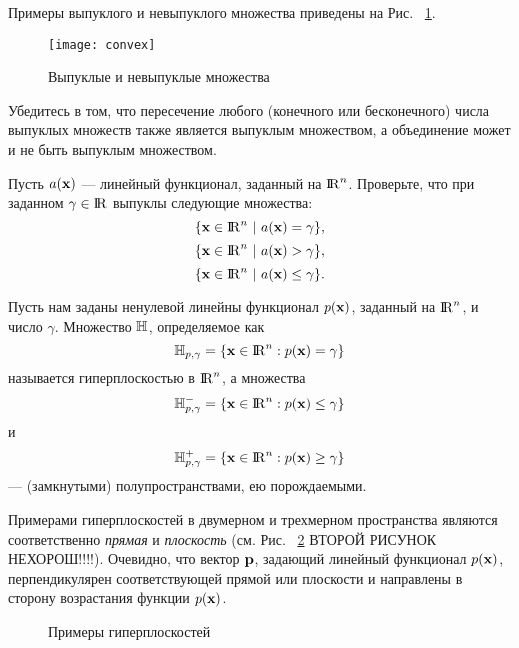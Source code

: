 












Примеры выпуклого и невыпуклого множества приведены на Рис.~
\ref{fig:nonconvex}.

\begin{figure} \centering
\texttt{[image: convex]}
\caption{Выпуклые и невыпуклые множества \cite{Gale:1963}}
\label{fig:nonconvex}
\end{figure}

\begin{exer}
Убедитесь в том, что пересечение  любого (конечного или
бесконечного) числа выпуклых множеств также является выпуклым
множеством, а объединение может и не быть выпуклым множеством.
\end{exer}

\begin{exer}
    Пусть $a(\mathbf{x})$ --- линейный функционал, заданный на ${\rm I\!R}^{n}$.
    Проверьте, что при заданном  $\gamma\in{\rm I\!R}$
    выпуклы следующие множества:
    \[\{\vc{x}\in\R^{n} \ | \ a(\vc{x})=\gamma\},\]
    \[\{\vc{x}\in\R^{n} \ | \ a(\vc{x})>\gamma\},\]
    \[\{\vc{x}\in\R^{n} \ | \ a(\vc{x})\leq\gamma\}.\]
\end{exer}



    Пусть нам заданы ненулевой линейны функционал $p(\mathbf{x})$, заданный на ${\rm I\!R}^{n}$,
    и число $\gamma $.
    Множество $\mathbb{H}$, определяемое как
\[
\mathbb{H}_{p,\gamma}= \{ \mathbf{x}\in {\rm I\!R}^n: p(\mathbf{x}) = \gamma\}
\]
    называется гиперплоскостью в ${\rm I\!R}^n$, а множества
\[
\mathbb{H}_{p,\gamma}^{-}= \{ \mathbf{x}\in {\rm I\!R}^n: p(\mathbf{x})\leq\gamma\}
\]
    и
\[
\mathbb{H}_{p,\gamma}^{+}= \{ \mathbf{x}\in {\rm I\!R}^n: p(\mathbf{x})\geq\gamma\}
\]
    --- (замкнутыми) полупространствами, ею порождаемыми.


    Примерами гиперплоскостей в двумерном и трехмерном пространства
    являются соответственно \emph{прямая} и \emph{плоскость} (см. Рис.
    ~\ref{fig:Hplanes_exam} ВТОРОЙ РИСУНОК НЕХОРОШ!!!!). Очевидно, что вектор $\mathbf{p}$, задающий
    линейный функционал $p(\mathbf{x})$, перпендикулярен соответствующей прямой или плоскости и
    направлены в сторону возрастания функции $p(\mathbf{x})$.

\begin{figure}
\centering
\renewcommand{\thesubfigure}{\asbuk{subfigure})}
\hfill
{}
\caption{Примеры гиперплоскостей}\label{fig:Hplanes_exam}
\end{figure}



